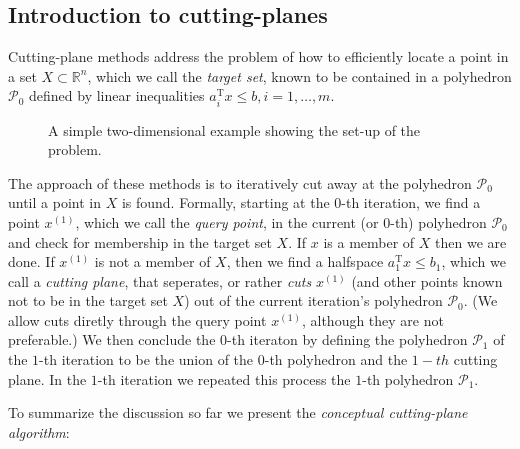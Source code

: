 \documentclass[11pt]{amsart}
\theoremstyle{definition}
\theoremstyle{remark}
\newcommand{\transpose}{\text{T}}
\begin{document}
    \subsection{Introduction to cutting-planes}
        Cutting-plane methods address the problem of how to efficiently locate a point in a set $X \subset \mathbb{R}^n$, which we call the \emph{target set}, known to be contained in a polyhedron $\mathcal{P_0}$ defined by linear inequalities $a_i^\transpose x \leq b, i = 1, \dots, m$. 

        \begin{figure}
            \caption{A simple two-dimensional example showing the set-up of the problem.}
        \end{figure}

        The approach of these methods is to iteratively cut away at the polyhedron $\mathcal{P_0}$ until a point in $X$ is found. Formally, starting at the $0$-th iteration, we find a point $x^{(1)}$, which we call the \emph{query point}, in the current (or $0$-th) polyhedron $\mathcal{P}_0$ and check for membership in the target set $X$. If $x$ is a member of $X$ then we are done. If $x^{(1)}$ is not a member of $X$, then we find a halfspace $a_{1}^\transpose x \leq b_{1}$, which we call a \emph{cutting plane}, that seperates, or rather \emph{cuts} $x^{(1)}$ (and other points known not to be in the target set $X$) out of the current iteration's polyhedron $\mathcal{P}_0$. (We allow cuts diretly through the query point $x^{(1)}$, although they are not preferable.) We then conclude the $0$-th iteraton by defining the polyhedron $\mathcal{P}_1$ of the $1$-th iteration to be the union of the $0$-th polyhedron and the $1-th$ cutting plane. In the $1$-th iteration we repeated this process the $1$-th polyhedron $\mathcal{P}_1$. 

        To summarize the discussion so far we present the \emph{conceptual cutting-plane algorithm}:
\end{document}
